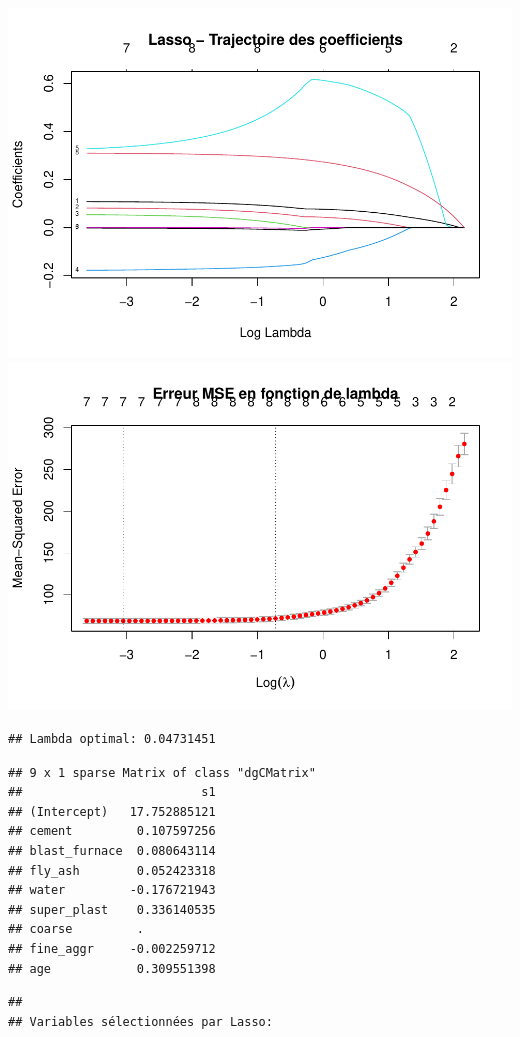 \documentclass[
  12pt,
]{article}
\begin{document}
\includegraphics{rmd_final_files/figure-latex/unnamed-chunk-63-1.pdf}
\includegraphics{rmd_final_files/figure-latex/unnamed-chunk-63-2.pdf}

\begin{verbatim}
## Lambda optimal: 0.04731451
\end{verbatim}

\begin{verbatim}
## 9 x 1 sparse Matrix of class "dgCMatrix"
##                         s1
## (Intercept)   17.752885121
## cement         0.107597256
## blast_furnace  0.080643114
## fly_ash        0.052423318
## water         -0.176721943
## super_plast    0.336140535
## coarse         .          
## fine_aggr     -0.002259712
## age            0.309551398
\end{verbatim}

\begin{verbatim}
## 
## Variables sélectionnées par Lasso:
\end{verbatim}
\end{document}
